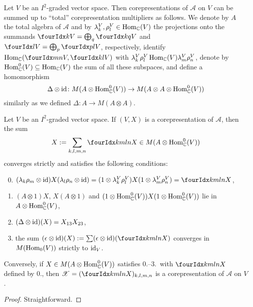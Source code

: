 Let $V$ be an $I^{2}$-graded vector space. Then corepresentations of
$\mathscr{A}$ on $V$ can be summed up to ``total''
corepresentation multipliers as follows.  We denote by $A$ the total
algebra of $\mathscr{A}$ and by $\lambda^{V}_{k},\rho^{V}_{l} \in
\operatorname{Hom}_{\mathbb{C}}(V)$ the projections onto the summands $\Gru{V}{k}{} =
\bigoplus_{q} \Gru{V}{k}{q}$ and
$\Gru{V}{}{l}=\bigoplus_{p}\Gru{V}{p}{l}$, respectively, identify
$\Hom_{\C}(\Gru{V}{m}{n},\Gru{V}{k}{l})$ with
$\lambda^{V}_{k}\rho^{V}_{l}\operatorname{Hom}_{\mathbb{C}}(V)\lambda^{V}_{m}\rho^{V}_{n}$,
denote by $\operatorname{Hom}_{\mathbb{C}}^{0}(V) \subseteq \operatorname{Hom}_{\mathbb{C}}(V)$ the sum of all
these subspaces, and define a homomorphism
\begin{align*}
  \Delta \otimes \operatorname{id} \colon M(A \otimes \operatorname{Hom}_{\mathbb{C}}^{0}(V)) \to M(A
  \otimes A \otimes \operatorname{Hom}_{\mathbb{C}}^{0}(V))
\end{align*}
similarly as we defined $ \Delta \colon A \to M(A\otimes A)$.
\begin{Lem} \label{lemma:corep-multiplier}
  Let $V$ be an $I^{2}$-graded vector space.  If $(V,X)$ is a
  corepresentation of $\mathscr{A}$, then the sum
  \begin{align}
    \label{eq:corep-multiplier}
  X:=\sum_{k,l,m,n} \Gr{X}{k}{l}{m}{n} \in  M(A
  \otimes \Hom_{\C}^{0}(V))
  \end{align}
 converges strictly and satisfies the following conditions:
  \begin{enumerate}\setcounter{enumi}{-1}
  \item $(\lambda_{k}\rho_{m} \otimes \id){X}(\lambda_{l}\rho_{n}
    \otimes \id) = (1 \otimes \lambda^{V}_{k}\rho^{V}_{l}){X}(1 \otimes
    \lambda^{V}_{m}\rho^{V}_{n}) = \Gr{X}{k}{l}{m}{n}$,
  \item $(A \otimes 1){X}$, $ {X}(A \otimes 1)$ and $(1 \otimes
    \operatorname{Hom}^{0}_{\mathbb{C}}(V))X(1 \otimes \operatorname{Hom}^{0}_{\mathbb{C}}(V))$ lie in $A \otimes \operatorname{Hom}_{\mathbb{C}}^{0}(V)$,
  \item $(\Delta\otimes \operatorname{id})(X)=X_{13}X_{23}$, 
  \item the sum $(\epsilon \otimes \id)({X}) :=\sum (\epsilon \otimes
    \id)(\Gr{X}{k}{l}{m}{n})$ converges in $M(\operatorname{Hom}_{0}(V))$ strictly
    to $\operatorname{id}_{V}$.
  \end{enumerate}
  Conversely, if $ X \in M(A \otimes \operatorname{Hom}_{\mathbb{C}}^{0}(V))$ satisfies
  0.--3.\ with $\Gr{X}{k}{l}{m}{n}$ defined by 0., then
  $\mathscr{X}=(\Gr{X}{k}{l}{m}{n})_{k,l,m,n}$ is a corepresentation
  of $\mathscr{A}$ on $V$.
\end{Lem}
\begin{proof}
 Straightforward.
\end{proof}



